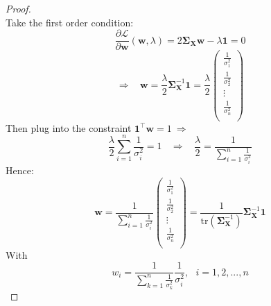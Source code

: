 \documentclass[a4paper, 10pt]{article}
\theoremstyle{definition}
\theoremstyle{hSol}
\begin{document}
\begin{proof}
\begin{equation}
\end{equation}
Take the first order condition:
\begin{equation}
  \frac{\partial \mathcal{L}}{\partial \bm{w}} (\bm{w}, \lambda) = 2\bm{\Sigma}_{\bm{X}} \bm{w} - \lambda \bm{1} = 0
\end{equation}
\begin{equation}
  \Rightarrow~~~~\bm{w} = \frac{\lambda}{2} \bm{\Sigma}_{\bm{X}}^{-1}\bm{1} = \frac{\lambda}{2} \begin{pmatrix}
    \frac{1}{\sigma_1^2}\\
    \frac{1}{\sigma_2^2}\\
    \vdots\\
    \frac{1}{\sigma_n^2}\\
  \end{pmatrix}
\end{equation}
Then plug into the constraint $\bm{1}^{\top} \bm{w} = 1~\Rightarrow$
\begin{equation}
  \frac{\lambda}{2}\sum_{i=1}^n \frac{1}{\sigma_i^2} = 1~~~~\Rightarrow~~~~\frac{\lambda}{2} = \frac{1}{\sum_{i=1}^n \frac{1}{\sigma_i^2}}
\end{equation}
Hence:
\begin{equation}
  \bm{w} = \frac{1}{\sum_{i=1}^n \frac{1}{\sigma_i^2}} \begin{pmatrix}
    \frac{1}{\sigma_1^2}\\
    \frac{1}{\sigma_2^2}\\
    \vdots\\
    \frac{1}{\sigma_n^2}\\
  \end{pmatrix} = \frac{1}{\text{tr}(\bm{\Sigma}_{\bm{X}}^{-1})}\bm{\Sigma}_{\bm{X}}^{-1}\bm{1}
\end{equation}
With
$$
w_i = \frac{1}{\sum_{k=1}^n \frac{1}{\sigma_k^2}} \frac{1}{\sigma_i^2},~~~i=1,2,...,n
$$
\end{proof}
\end{document}
